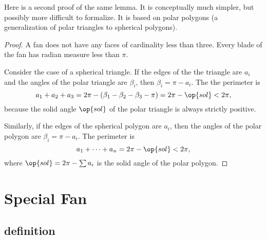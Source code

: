 Here is a second proof of the same lemma.  It is conceptually much
simpler, but possibly more difficult to formalize.  It is based on polar
polygons (a generalization of polar triangles to spherical polygons).

\begin{proof} A fan does not have any faces of cardinality less than
three.  Every blade of the fan has radian measure less than $\pi$.
%

Consider the case of a spherical triangle.  If the edges of the
the triangle are $a_i$ and the angles of the polar
triangle are $\beta_i$, then $\beta_i=\pi-a_i$.
The the perimeter is 
\begin{displaymath}a_1+a_2+a_3 = 2\pi - (\beta_1 -\beta_2 -
\beta_3-\pi)= 2\pi-\op{sol} < 2\pi,\end{displaymath} because the
solid angle $\op{sol}$ of the polar triangle is always strictly
positive.  %

Similarly, if the edges of the spherical polygon are
$a_i$, then the angles of the polar polygon are $\beta_i = \pi-a_i$.
The perimeter is
\begin{displaymath}
a_1+\cdots+a_n  = 2\pi- \op{sol}< 2\pi,
\end{displaymath}
where $\op{sol} = 2\pi-\sum a_i$ is the solid angle of the polar polygon.
%
\end{proof}


\section{Special Fan}\label{sec:weight}  






\subsection{definition}

